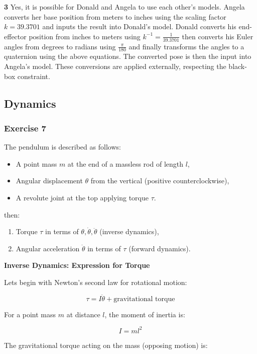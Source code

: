 \documentclass[12pt,a4paper]{article}
\begin{document}
\textbf{3} Yes, it is possible for Donald and Angela to use each other’s models. Angela converts her base position from meters to inches using the scaling factor $ k = 39.3701 $ and inputs the result into Donald’s model. Donald converts his end-effector position from inches to meters using $ k^{-1} = \frac{1}{39.3701} $ then converts his Euler angles from degrees to radians using $ \frac{\pi}{180} $ and finally transforms the angles to a quaternion using the above equations. The converted pose is then the input into Angela’s model. These conversions are applied externally, respecting the black-box constraint.



\subsection{Dynamics}
\subsubsection*{Exercise 7}

The pendulum is described as follows:
\begin{itemize}
  \item A point mass \( m \) at the end of a massless rod of length \( l \),
  \item Angular displacement \( \theta \) from the vertical (positive counterclockwise),
  \item A revolute joint at the top applying torque \( \tau \).
\end{itemize}

then:
\begin{enumerate}
  \item Torque \( \tau \) in terms of \( \theta, \dot{\theta}, \ddot{\theta} \) (inverse dynamics),
  \item Angular acceleration \( \ddot{\theta} \) in terms of \( \tau \) (forward dynamics).
\end{enumerate}

\textbf{Inverse Dynamics: Expression for Torque}

Lets begin with Newton’s second law for rotational motion:

\[
\tau = I\ddot{\theta} + \text{gravitational torque}
\]

For a point mass \( m \) at distance \( l \), the moment of inertia is:

\[
I = ml^2
\]

The gravitational torque acting on the mass (opposing motion) is:
\end{document}
